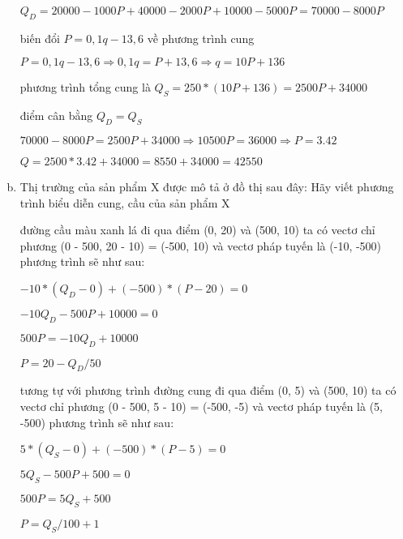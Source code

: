 \begin{enumerate}[a.]
    $Q_D = 20000 - 1000P + 40000 - 2000P +  10000 - 5000P = 70000 - 8000P$

    biến đổi  $P = 0,1q - 13,6$ về phương trình cung 

    $P = 0,1q - 13,6 \Rightarrow  0,1q = P + 13,6 \Rightarrow q = 10P + 136$

    phương trình tổng cung là 
    $Q_S = 250 * ( 10P + 136) = 2500P + 34000$


    điểm cân bằng 
    $Q_D = Q_S$

    $70000 - 8000P = 2500P + 34000 \Rightarrow 10500P = 36000 \Rightarrow P = 3.42$

    $Q = 2500 * 3.42 + 34000 = 8550 + 34000 = 42550$
    \item  Thị trường của sản phẩm X được mô tả ở đồ thị sau đây:
    Hãy viết phương trình biểu diễn cung, cầu của sản phẩm X

    đường cầu màu xanh lá đi qua điểm (0, 20) và (500, 10)
    ta có vectơ chỉ phương (0 - 500, 20 - 10) = (-500, 10)
    và vectơ pháp tuyến là (-10, -500)
    phương trình sẽ như sau: 
    
    $-10 * (Q_D - 0) + (-500) * (P - 20) = 0$

    $-10Q_D - 500P + 10000 = 0$

    $500P = -10Q_D + 10000$

    $P = 20  -Q_D / 50$

    tương tự với phương trình đường cung đi qua điểm (0, 5)  và (500, 10)
    ta có vectơ chỉ phương (0 - 500, 5 - 10) = (-500, -5)
    và vectơ pháp tuyến là (5, -500)
    phương trình sẽ như sau: 
    
    $5* (Q_S - 0) + (-500) * (P - 5) = 0$

    $5Q_S - 500P + 500 = 0$

    $500P = 5Q_S + 500$

    $P = Q_S / 100 + 1$

\end{enumerate}


